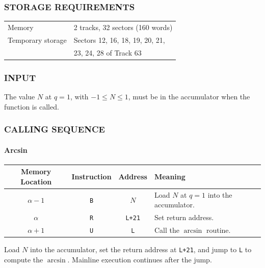 \subsubsection*{STORAGE REQUIREMENTS}
\begin{center}
\begin{tabular}{ll}
    \toprule
    Memory & 2 tracks, 32 sectors (160 words) \\
    Temporary storage & Sectors 12, 16, 18, 19, 20, 21, \\
     & 23, 24, 28 of Track 63 \\
    \bottomrule
\end{tabular}
\end{center}

\subsubsection*{INPUT}
The value $N$ at $q=1$, with $-1 \le N \le 1$, must be in the accumulator when the function is called.

\subsubsection*{CALLING SEQUENCE}
\paragraph{Arcsin}
\begin{center}
\begin{tabularx}{\textwidth}{cccX}
\toprule
\textbf{Memory Location} & \textbf{Instruction} & \textbf{Address} & \textbf{Meaning} \\
\midrule
$\alpha-1$      & \texttt{B} & $N$                  & Load $N$ at $q=1$ into the accumulator.\\
$\alpha$   & \texttt{R} & \texttt{L+21} & Set return address. \\
$\alpha+1$      & \texttt{U}          & \texttt{L}       & Call the $\arcsin$ routine.\\
\bottomrule
\end{tabularx}
\end{center}

Load $N$ into the accumulator, set the return address at \texttt{L+21}, and jump to \texttt{L} to compute the $\arcsin$. Mainline execution continues after the jump.

